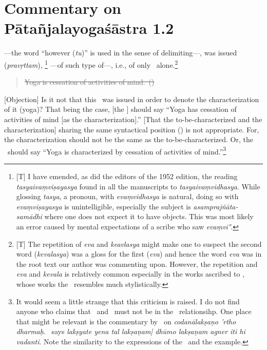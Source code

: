 \section{Commentary on Pātañjalayogaśāstra 1.2}
—the word ``however (\emph{tu})'' is used in the sense of delimiting—, was issued (\emph{pravṛttam}), \footnote{[T] I have emended, as did the editors of the 1952 edition, the reading \emph{tasyaivaṃviṣayasya} found in all the manuscripts to \emph{tasyaivaṃvidhasya}. While glossing \emph{tasya}, a pronoun, with \emph{evaṃvidhasya} is natural, doing so with \emph{evaṃviṣayasya} is unintelligible, especially the subject is \emph{asamprajñāta-samādhi} where one does not expect it to have objects. This was most likely an error caused by mental expectations of a scribe who saw \emph{evaṃvi°}.} —of such type of—\samadhi, i.e., of only \asamprajnata\ alone.\footnote{[T] The repetition of \emph{eva} and \emph{keavlasya} might make one to suspect the second word (\emph{kevalasya}) was a gloss for the first (\emph{eva}) and hence the word \emph{eva} was in the root text our author was commenting upon. However, the repetition and \emph{eva} and \emph{kevala} is relatively common especially in the works ascribed to \Sankara, whose works the \YVi\ resembles much stylistically.} 

\begin{quotation}
\st{Yoga
 is cessation of activities of mind.~()}
\end{quotation}

[Objection] Is it not that this \sutra\ was issued in order to denote the characterization of it (yoga)? That being the case, [the \sutra] should say ``Yoga has cessation of activities of mind [as the characterization].'' [That the to-be-characterized and the characterization] sharing the same syntactical position (\samanadhikaranya) is not appropriate. For, the characterization should not be the same as the to-be-characterized. Or, the \sutra\ should say ``Yoga is characterized by cessation of activities of mind.''\footnote{It would seem a little strange that this criticism is raised. I do not find anyone who claims that \laksya\ and \laksana\ must not be in the \samanadhikaranya\ relationsihp. One place that might be relevant is the commentary by \Sabara\ on  \emph{codanālakṣaṇo 'rtho dharmaḥ}. \Sabara\ says \emph{lakṣyate yena tal lakṣaṇam| dhūmo lakṣaṇam agner iti hi vadanti}. Note the similarity to the expressions of the \sutra\ and the example. }

